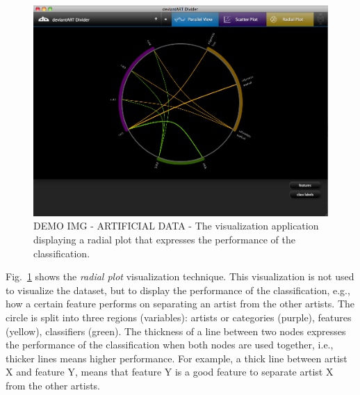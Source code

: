 \begin{figure}[htb]
  \centering
  \includegraphics[width=1\linewidth]{img/visualization_radial.png}
  \caption{DEMO IMG - ARTIFICIAL DATA - The visualization application displaying a radial plot that expresses the performance of the classification.}
  \label{fig:visualization_radial}
\end{figure}

Fig.~\ref{fig:visualization_radial} shows the \textit{radial plot} visualization technique.
This visualization is not used to visualize the dataset, but to display the performance of the classification, e.g., how a certain feature performs on separating an artist from the other artists.
The circle is split into three regions (variables): artists or categories (purple), features (yellow), classifiers (green).
The thickness of a line between two nodes expresses the performance of the classification when both nodes are used together, i.e., thicker lines means higher performance.
For example, a thick line between artist X and feature Y, means that feature Y is a good feature to separate artist X from the other artists.